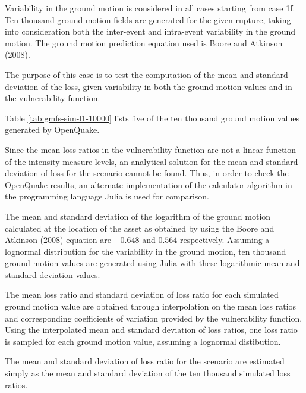 Variability in the ground motion is considered in all cases starting from case 1f. Ten thousand ground motion fields are generated for the given rupture, taking into consideration both the inter-event and intra-event variability in the ground motion. The ground motion prediction equation used is Boore and Atkinson (2008).

The purpose of this case is to test the computation of the mean and standard deviation of the loss, given variability in both the ground motion values and in the vulnerability function.



Table \ref{tab:gmfs-sim-l1-10000} lists five of the ten thousand ground motion values generated by OpenQuake.

Since the mean loss ratios in the vulnerability function are not a linear function of the intensity measure levels, an analytical solution for the mean and standard deviation of loss for the scenario cannot be found. Thus, in order to check the OpenQuake results, an alternate implementation of the calculator algorithm in the programming language Julia is used for comparison.

The mean and standard deviation of the logarithm of the ground motion calculated at the location of the asset as obtained by using the Boore and Atkinson (2008) equation are $-0.648$ and $0.564$ respectively. Assuming a lognormal distribution for the variability in the ground motion, ten thousand ground motion values are generated using Julia with these logarithmic mean and standard deviation values.

The mean loss ratio and standard deviation of loss ratio for each simulated ground motion value are obtained through interpolation on the mean loss ratios and corresponding coefficients of variation provided by the vulnerability function. Using the interpolated mean and standard deviation of loss ratios, one loss ratio is sampled for each ground motion value, assuming a lognormal distibution.

The mean and standard deviation of loss ratio for the scenario are estimated simply as the mean and standard deviation of the ten thousand simulated loss ratios.